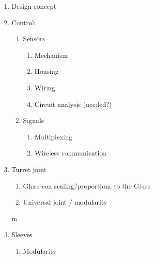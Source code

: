 \documentclass[11pt]{article}
\begin{document}
\begin{enumerate}
\item Design concept
\item Control:
  \begin{enumerate}
  \item Sensors
    \begin{enumerate}
    \item Mechanism
    \item Housing
    \item Wiring
    \item Circuit analysis (needed?)
    \end{enumerate}
  \item Signals
    \begin{enumerate}
    \item Multiplexing
    \item Wireless communication
    \end{enumerate}
  \end{enumerate}

\item Turret joint
  \begin{enumerate}
  \item Gluss-con scaling/proportions to the Gluss
  \item Universal joint / modularity
  \end{enumerate}
m\item Sleeves
  \begin{enumerate}
  \item Modularity
  \end{enumerate}


\end{enumerate}
\end{document}
